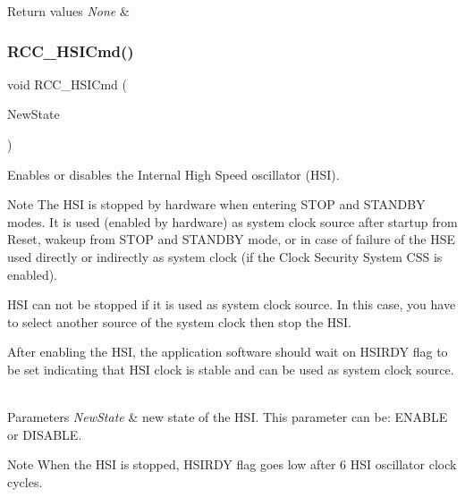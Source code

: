 \begin{DoxyRetVals}{Return values}
{\em None} & \\
\hline
\end{DoxyRetVals}
\mbox{\label{group___r_c_c_ga0c6772a1e43765909495f57815ef69e2}} 
\subsubsection{\texorpdfstring{R\+C\+C\+\_\+\+H\+S\+I\+Cmd()}{RCC\_HSICmd()}}
{\footnotesize\ttfamily void R\+C\+C\+\_\+\+H\+S\+I\+Cmd (\begin{DoxyParamCaption}\item[{Functional\+State}]{New\+State }\end{DoxyParamCaption})}



Enables or disables the Internal High Speed oscillator (H\+SI). 

\begin{DoxyNote}{Note}
The H\+SI is stopped by hardware when entering S\+T\+OP and S\+T\+A\+N\+D\+BY modes. It is used (enabled by hardware) as system clock source after startup from Reset, wakeup from S\+T\+OP and S\+T\+A\+N\+D\+BY mode, or in case of failure of the H\+SE used directly or indirectly as system clock (if the Clock Security System C\+SS is enabled). ~\newline


H\+SI can not be stopped if it is used as system clock source. In this case, you have to select another source of the system clock then stop the H\+SI. ~\newline


After enabling the H\+SI, the application software should wait on H\+S\+I\+R\+DY flag to be set indicating that H\+SI clock is stable and can be used as system clock source. ~\newline

\end{DoxyNote}

\begin{DoxyParams}{Parameters}
{\em New\+State} & new state of the H\+SI. This parameter can be\+: E\+N\+A\+B\+LE or D\+I\+S\+A\+B\+LE. \\
\hline
\end{DoxyParams}
\begin{DoxyNote}{Note}
When the H\+SI is stopped, H\+S\+I\+R\+DY flag goes low after 6 H\+SI oscillator clock cycles. ~\newline

\end{DoxyNote}

